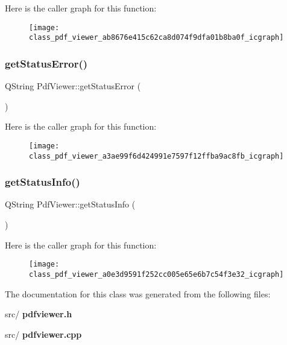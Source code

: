 Here is the caller graph for this function\+:\nopagebreak
\begin{figure}[H]
\begin{center}
\leavevmode
\texttt{[image: class\_pdf\_viewer\_ab8676e415c62ca8d074f9dfa01b8ba0f\_icgraph]}
\end{center}
\end{figure}
\mbox{\label{class_pdf_viewer_a3ae99f6d424991e7597f12ffba9ac8fb}} 
\subsubsection{get\+Status\+Error()}
{\footnotesize\ttfamily Q\+String Pdf\+Viewer\+::get\+Status\+Error (\begin{DoxyParamCaption}{ }\end{DoxyParamCaption})}

Here is the caller graph for this function\+:\nopagebreak
\begin{figure}[H]
\begin{center}
\leavevmode
\texttt{[image: class\_pdf\_viewer\_a3ae99f6d424991e7597f12ffba9ac8fb\_icgraph]}
\end{center}
\end{figure}
\mbox{\label{class_pdf_viewer_a0e3d9591f252cc005e65e6b7c54f3e32}} 
\subsubsection{get\+Status\+Info()}
{\footnotesize\ttfamily Q\+String Pdf\+Viewer\+::get\+Status\+Info (\begin{DoxyParamCaption}{ }\end{DoxyParamCaption})}

Here is the caller graph for this function\+:\nopagebreak
\begin{figure}[H]
\begin{center}
\leavevmode
\texttt{[image: class\_pdf\_viewer\_a0e3d9591f252cc005e65e6b7c54f3e32\_icgraph]}
\end{center}
\end{figure}


The documentation for this class was generated from the following files\+:\begin{DoxyCompactItemize}
\item 
src/\textbf{ pdfviewer.\+h}\item 
src/\textbf{ pdfviewer.\+cpp}\end{DoxyCompactItemize}
